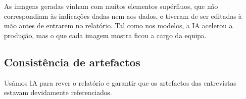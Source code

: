 As imagens geradas vinham com muitos elementos supérfluos, que não correspondiam às indicações dadas nem aos dados, e tiveram de ser editadas à mão antes de entrarem no relatório. Tal como nos modelos, a IA acelerou a produção, mas o que cada imagem mostra ficou a cargo da equipa.

\subsection{Consistência de artefactos}
Usámos IA para rever o relatório e garantir que os artefactos das entrevistas estavam devidamente referenciados. 

